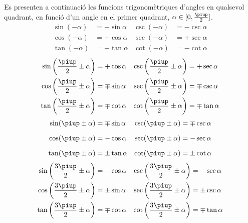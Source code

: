  Es presenten a continuació  les funcions trigonomètriques d'angles en qualsevol
quadrant, en funció d'un angle en el primer quadrant,
$\alpha\in[0,\frac{\piup}{2}]$.
\begin{subequations}
\begin{align}
    \sin(-\alpha) &= -\sin\alpha  & \csc(-\alpha) &= -\csc\alpha \\[1.5ex]
    \cos(-\alpha) &= +\cos\alpha  & \sec(-\alpha) &= +\sec\alpha \\[1.5ex]
    \tan(-\alpha) &= -\tan\alpha  & \cot(-\alpha) &= -\cot\alpha
\end{align}
\end{subequations}
\vspace{-5mm}
\begin{subequations}
\begin{align}
    \sin\left(\frac{\piup}{2}\pm\alpha\right) &= +\cos\alpha    & \csc\left(\frac{\piup}{2}\pm\alpha\right) &= +\sec\alpha \\
    \cos\left(\frac{\piup}{2}\pm\alpha\right) &= \mp\sin\alpha  & \sec\left(\frac{\piup}{2}\pm\alpha\right) &= \mp\csc\alpha \\
    \tan\left(\frac{\piup}{2}\pm\alpha\right) &= \mp\cot\alpha  & \cot\left(\frac{\piup}{2}\pm\alpha\right) &= \mp\tan\alpha
\end{align}
\end{subequations}
\vspace{-5mm}
\begin{subequations}
\begin{align}
    \sin(\piup\pm\alpha) &= \mp\sin\alpha  & \csc(\piup\pm\alpha) &= \mp\csc\alpha \\[1.5ex]
    \cos(\piup\pm\alpha) &= -\cos\alpha    & \sec(\piup\pm\alpha) &= -\sec\alpha \\[1.5ex]
    \tan(\piup\pm\alpha) &= \pm\tan\alpha  & \cot(\piup\pm\alpha) &= \pm\cot\alpha
\end{align}
\end{subequations}
\vspace{-5mm}
\begin{subequations}
\begin{align}
    \sin\left(\frac{3\piup}{2}\pm\alpha\right) &= -\cos\alpha    & \csc\left(\frac{3\piup}{2}\pm\alpha\right) &= -\sec\alpha \\
    \cos\left(\frac{3\piup}{2}\pm\alpha\right) &= \pm\sin\alpha  & \sec\left(\frac{3\piup}{2}\pm\alpha\right) &= \pm\csc\alpha \\
    \tan\left(\frac{3\piup}{2}\pm\alpha\right) &= \mp\cot\alpha  & \cot\left(\frac{3\piup}{2}\pm\alpha\right) &= \mp\tan\alpha
\end{align}
\end{subequations}
